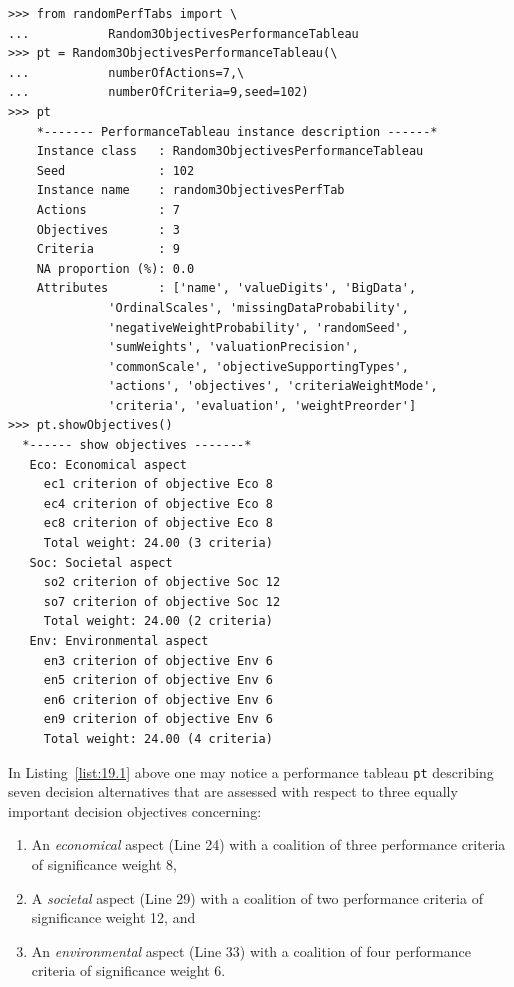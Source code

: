 \begin{lstlisting}[caption={Generate a Random 3 Objectives Performance Tableau},label=list:19.1]
>>> from randomPerfTabs import \
...           Random3ObjectivesPerformanceTableau
>>> pt = Random3ObjectivesPerformanceTableau(\
...           numberOfActions=7,\
...           numberOfCriteria=9,seed=102)
>>> pt
    *------- PerformanceTableau instance description ------*
    Instance class   : Random3ObjectivesPerformanceTableau
    Seed             : 102
    Instance name    : random3ObjectivesPerfTab
    Actions          : 7
    Objectives       : 3
    Criteria         : 9
    NA proportion (%): 0.0
    Attributes       : ['name', 'valueDigits', 'BigData',
              'OrdinalScales', 'missingDataProbability',
              'negativeWeightProbability', 'randomSeed',
              'sumWeights', 'valuationPrecision',
              'commonScale', 'objectiveSupportingTypes',
              'actions', 'objectives', 'criteriaWeightMode',
              'criteria', 'evaluation', 'weightPreorder']
>>> pt.showObjectives()
  *------ show objectives -------*
   Eco: Economical aspect
     ec1 criterion of objective Eco 8
     ec4 criterion of objective Eco 8
     ec8 criterion of objective Eco 8
     Total weight: 24.00 (3 criteria)
   Soc: Societal aspect
     so2 criterion of objective Soc 12
     so7 criterion of objective Soc 12
     Total weight: 24.00 (2 criteria)
   Env: Environmental aspect
     en3 criterion of objective Env 6
     en5 criterion of objective Env 6
     en6 criterion of objective Env 6
     en9 criterion of objective Env 6
     Total weight: 24.00 (4 criteria)
\end{lstlisting}

In Listing~\ref{list:19.1} above one may notice a performance tableau \texttt{pt} describing seven decision alternatives that are assessed with respect to three equally important decision objectives concerning:
\begin{enumerate}[topsep=1pt]
\item An \emph{economical} aspect (Line 24) with a coalition of three performance criteria of significance weight 8,
\item A \emph{societal} aspect (Line 29) with a coalition of two performance criteria of significance weight 12, and
\item An \emph{environmental} aspect (Line 33) with a coalition of four performance criteria of significance weight 6.
\end{enumerate}

